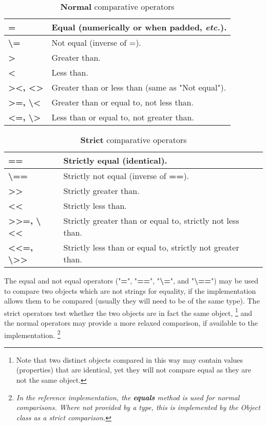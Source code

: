 \begin{table}\caption{\textbf{Normal} comparative
    operators}\label{table:Normal Comparators}
\begin{tabularx}{\textwidth}{>{\bfseries}lX}
\toprule
=&Equal (numerically or when padded, \emph{etc.}).
\\\midrule
\textbackslash =&Not equal (inverse of =).
\\\midrule
>&Greater than.
\\\midrule
<&Less than.
\\\midrule
><, <>&Greater than or less than (same as "Not equal").
\\\midrule
>=, \textbackslash <&Greater than or equal to, not less than.
\\\midrule
<=, \textbackslash >&Less than or equal to, not greater than.
\\\bottomrule
\end{tabularx}
\end{table}
\begin{table}\caption{\textbf{Strict} comparative  operators}\label{table:Strict Comparators}
\begin{tabularx}{\textwidth}{>{\bfseries}lX}
\toprule
==&Strictly equal (identical).
\\\midrule
\textbackslash ==&Strictly not equal (inverse of \textbf{==}).
\\\midrule
>{}>&Strictly greater than.
\\\midrule
<{}<&Strictly less than.
\\\midrule
>{}>=, \textbackslash <{}<&Strictly greater than or equal to, strictly not
less than.
\\\midrule
<{}<=, \textbackslash >{}>&Strictly less than or equal to, strictly not
greater than.
\\\bottomrule
\end{tabularx}
\end{table}
The equal and not equal operators ("\textbf{=}",
"\textbf{==}", "\textbf{\textbackslash =}", and
"\textbf{\textbackslash ==}") may be used to compare two objects which
are not strings for equality, if the implementation allows them to be
compared (usually they will need to be of the same type).  The strict
operators test whether the two objects are in fact the same object,
\footnote{
Note that two distinct objects compared in this way may contain values
(properties) that are identical, yet they will not compare equal as they
are not the same object.
}
and the normal operators may provide a more relaxed comparison, if
available to the implementation.
\footnote{
\emph{In the reference implementation, the \textbf{equals} method is
used for normal comparisons.  Where not provided by a type, this is
implemented by the Object class as a strict comparison.}
}
 

